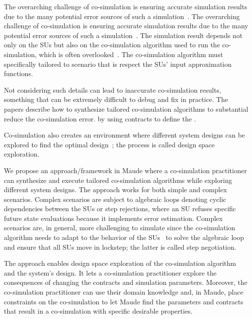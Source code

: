 The overarching challenge of co-simulation is ensuring accurate simulation results due to the many potential error sources of such a simulation~\cite{Gomes2018}.
The overarching challenge of co-simulation is ensuring accurate simulation results due to the many potential error sources of such a simulation~\cite{Gomes2018}.
The simulation result depends not only on the SUs but also on the co-simulation algorithm used to run the co-simulation, which is often overlooked~\cite{Gomes2019,Oakes2021,Gomes2018f,Schweizer2015c,hansen_verification_2021}.
The co-simulation algorithm must specifically tailored to scenario that is respect the SUs' input approximation functions.

Not considering such details can lead to inaccurate co-simulation results, something that can be extremely difficult to debug and fix in practice.
The papers \cite{Gomes2019,Oakes2021,thrane2021} describe how to synthesize tailored co-simulation algorithms to substantial reduce the co-simulation error. by using contracts to define the .

Co-simulation also creates an environment where different system designs can be explored to find the optimal design~\cite{dse,gamble_design_2014}; the process is called design space exploration.

We propose an approach/framework in Maude where a co-simulation practitioner can synthesize and execute tailored co-simulation algorithms while exploring different system designs.
The approach works for both simple and complex scenarios.
Complex scenarios are subject to algebraic loops denoting cyclic dependencies between the SUs or step rejections, where an  SU refuses specific future state evaluations because it implements error estimation.
Complex scenarios are, in general, more challenging to simulate since the co-simulation algorithm needs to adapt to the behavior of the SUs~\cite{thrane2021} to solve the algebraic loop and ensure that all SUs move in lockstep; the latter is called step negotiation. 

The approach enables design space exploration of the co-simulation algorithm and the system's design.
It lets a co-simulation practitioner explore the consequences of changing the contracts and simulation parameters.
Moreover, the co-simulation practitioner can use their domain knowledge and, in Maude, place constraints on the co-simulation to let Maude find the parameters and contracts that result in a co-simulation with specific desirable properties. 

